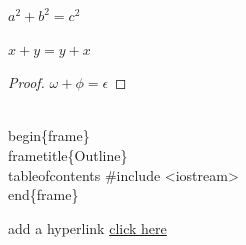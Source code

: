 \documentclass{beamer} %
\begin{document}
\begin{frame}
	\begin{theorem}[Pythagoras] 
	$ a^2 + b^2 = c^2$
	\end{theorem}
	\begin{corollary}
	$ x + y = y + x  $
	\end{corollary}
	\begin{proof}
	$\omega +\phi = \epsilon $
	\end{proof} 
\end{frame} 

\begin{frame}[fragile] %
	\begin{semiverbatim}
	\\begin\{frame\}
	\\frametitle\{Outline\}
	\\tableofcontents
	\#include <iostream>
	\\end\{frame\}
	\end{semiverbatim}
add a hyperlink 
\hyperlink{contents}{click here}
\hyperlink{contents}{}
\hyperlink{columns}{}
\hyperlink{pictures}{} 
\hyperlink{pictures}{}
\end{frame}
\end{document}
